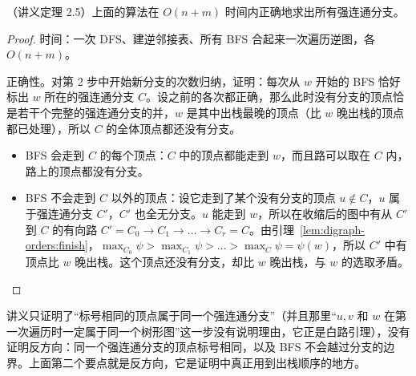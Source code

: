 \begin{theorem}\label{thm:digraph-orders:scc}
（讲义定理 2.5）上面的算法在 $O(n+m)$ 时间内正确地求出所有强连通分支。
\end{theorem}
\begin{proof}
时间：一次 DFS、建逆邻接表、所有 BFS 合起来一次遍历逆图，各 $O(n+m)$。

正确性。对第 2 步中开始新分支的次数归纳，证明：每次从 $w$ 开始的 BFS 恰好标出 $w$ 所在的强连通分支 $C$。设之前的各次都正确，那么此时没有分支的顶点恰是若干个完整的强连通分支的并，$w$ 是其中出栈最晚的顶点（比 $w$ 晚出栈的顶点都已处理），所以 $C$ 的全体顶点都还没有分支。
\begin{itemize}
\item BFS 会走到 $C$ 的每个顶点：$C$ 中的顶点都能走到 $w$，而且路可以取在 $C$ 内，路上的顶点都没有分支。
\item BFS 不会走到 $C$ 以外的顶点：设它走到了某个没有分支的顶点 $u\notin C$，$u$ 属于强连通分支 $C'$，$C'$ 也全无分支。$u$ 能走到 $w$，所以在收缩后的图中有从 $C'$ 到 $C$ 的有向路 $C'=C_0\to C_1\to\dots\to C_r=C$。由引理~\ref{lem:digraph-orders:finish}，$\max_{C_0}\psi>\max_{C_1}\psi>\dots>\max_{C}\psi=\psi(w)$，所以 $C'$ 中有顶点比 $w$ 晚出栈。这个顶点还没有分支，却比 $w$ 晚出栈，与 $w$ 的选取矛盾。\qedhere
\end{itemize}
\end{proof}

\begin{remark}[讲义的证明]
讲义只证明了“标号相同的顶点属于同一个强连通分支”（并且那里“$u,v$ 和 $w$ 在第一次遍历时一定属于同一个树形图”这一步没有说明理由，它正是白路引理），没有证明反方向：同一个强连通分支的顶点标号相同，以及 BFS 不会越过分支的边界。上面第二个要点就是反方向，它是证明中真正用到出栈顺序的地方。
\end{remark}

